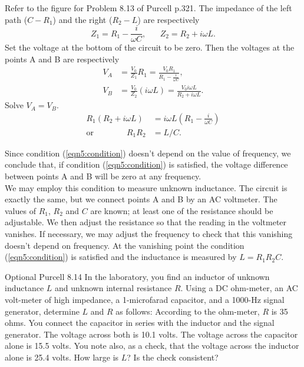 \documentclass[makesolutionspdf]{esg8022pset}
\begin{document}
\begin{solution}
  Refer to the figure for Problem 8.13 of Purcell p.321.  The impedance
  of the left path ($C-R_1$) and the right ($R_2 - L$) are respectively
  \[Z_1=R_1-\frac{i}{\omega C},\;\;\;\;\;\; Z_2=R_2+i\omega L.\]
  Set the voltage at the bottom of the circuit to be zero.  Then the
  voltages at the points A and B are respectively
  \begin{align}
  V_A & = \frac{V_0}{Z_1} R_1= \frac{V_0 R_1}{R_1-\frac{i}{\omega
  C}},\nonumber\\
  V_B & = \frac{V_0}{Z_2} (i\omega L)=\frac{V_0 i\omega L}{R_2+i\omega L}.
  \end{align}
  Solve $V_A=V_B$.
  \begin{align}
  R_1(R_2+i\omega L) & = i\omega L (R_1-\frac{i}{\omega C})\nonumber\\
  \text{or}\qquad\qquad R_1 R_2 & = L/C.\label{eqn5:condition}
  \end{align}

  Since condition (\ref{eqn5:condition}) doesn't depend on the value of
  frequency, we conclude that, if condition (\ref{eqn5:condition}) is
  satisfied, the voltage difference between points A and B will be zero
  at any frequency.\\

  We may employ this condition to measure unknown inductance.  The
  circuit is exactly the same, but we connect points A and B by an AC
  voltmeter.  The values of $R_1$, $R_2$ and $C$ are known; at least one
  of the resistance should be adjustable.  We then adjust the resistance
  so that the reading in the voltmeter vanishes.  If necessary, we may
  adjust the frequency to check that this vanishing doesn't depend on
  frequency.  At the vanishing point the condition
  (\ref{eqn5:condition}) is satisfied and the inductance is measured by
  $L=R_1 R_2 C$.
\end{solution}


\begin{problem}{Optional Purcell 8.14}
  In the laboratory, you find an inductor of unknown inductance $L$ and
  unknown internal resistance $R$.  Using a DC ohm-meter, an AC volt-meter
  of high impedance, a 1-microfarad capacitor, and a 1000-Hz signal
  generator, determine $L$ and $R$ as follows: According to the ohm-meter,
  $R$ is 35 ohms.  You connect the capacitor in series with the inductor
  and the signal generator.  The voltage across both is 10.1 volts.  The
  voltage across the capacitor alone is 15.5 volts. You note also, as a
  check, that the voltage across the inductor alone is 25.4 volts.  How
  large is $L$?  Is the check consistent?
\end{problem}
\end{document}
